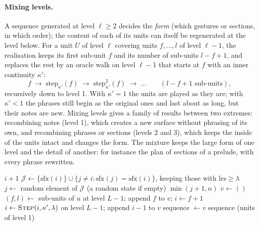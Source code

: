 \documentclass[11pt,a4paper]{article}
\begin{document}
\paragraph{Mixing levels.} A sequence generated at level $\ell \ge 2$
decides the \emph{form} (which gestures or sections, in which order); the
content of each of its units can itself be regenerated at the level below.
For a unit $U$ of level $\ell$ covering units $f, \dots, l$ of level $\ell-1$,
the realisation keeps its first sub-unit $f$ and its number of sub-units
$l - f + 1$, and replaces the rest by an oracle walk on level $\ell-1$ that
starts at $f$ with an inner continuity $\kappa'$:
\begin{equation}
  f \;\to\; \mathrm{step}_{\kappa'}(f) \;\to\; \mathrm{step}_{\kappa'}^2(f) \;\to\; \dots
  \qquad (l - f + 1 \text{ sub-units}),
\end{equation}
recursively down to level 1. With $\kappa' = 1$ the units are played as
they are; with $\kappa' < 1$ the phrases still begin as the original ones
and last about as long, but their notes are new. Mixing levels gives a
family of results between two extremes: recombining notes (level 1), which
creates a new surface without phrasing of its own, and recombining phrases
or sections (levels 2 and 3), which keeps the inside of the units intact and
changes the form. The mixture keeps the large form of one level and the
detail of another: for instance the plan of sections of a prelude, with
every phrase rewritten.

\begin{algorithm}[t]
\caption{Factor oracle step and level mixing}
\label{alg:oracle}
\begin{algorithmic}[1]
   \Return $i+1$ \EndIf
  \State $\mathcal{J} \gets \{\mathrm{sfx}(i)\} \cup \{ j \neq i : \mathrm{sfx}(j) = \mathrm{sfx}(i) \}$, keeping those with $\mathrm{lrs} \ge \lambda$
  \State $j \gets$ random element of $\mathcal{J}$ (a random state if empty)
  \State \Return $\min(j+1, n)$
\EndFunction
{}
    \State $v \gets ()$
      \State $(f, l) \gets$ sub-units of $u$ at level $L-1$; append $f$ to $v$; $i \gets f+1$
       $i \gets \textsc{Step}(i, \kappa', \lambda)$ on level $L-1$; append $i-1$ to $v$ \EndFor
    \EndFor
    \State sequence $\gets v$
  \EndFor
  \State \Return sequence (units of level 1)
\EndFunction
\end{algorithmic}
\end{algorithm}
\end{document}
